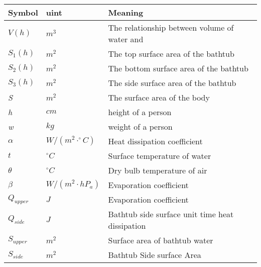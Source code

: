 \documentclass{mcmthesis}
\begin{document}
\begin{table}[H]
        \setlength{\abovecaptionskip}{0pt}
        \setlength{\belowcaptionskip}{0pt}
                 \\
        \begin{tabular}{p{1.8cm}|p{2.2cm}|p{9cm}}
        \hline
        \rowcolor[gray]{0.9}\bf{Symbol}	&\bf{uint}      &\bf{Meaning}\\
        \hline
        $V(h)$			& $m^3  $		 & The relationship between volume of water and  \\
        $S_{1}(h)$		& $m^2  $		 & The top surface area of the bathtub 	\\
        $S_{2}(h)$		& $m^2  $		 & The bottom surface area of the bathtub 	\\
        $S_{3}(h)$		& $m^2  $		 & The side surface area of the bathtub 	\\
        \emph{S}	& $m^2  $		 & The surface area of the body\\
        \emph{h}	& $cm	$        & height of a person \\
        \emph{w}	& $kg	$        & weight of a person \\
        $\alpha$		& $ W/(m^{2}\cdot ^{\circ}C)  $		 & Heat dissipation coefficient\\
        $t$		& $ ^{\circ}C  $		 & Surface temperature of water \\
        $\theta$		& $^{\circ}C$		 & Dry bulb temperature of air\\
        $\beta$		& $W/(m^{2}\cdot hP_{a})$		 & Evaporation coefficient\\
        $Q_{upper}$		& $J$		 & Evaporation coefficient\\
		$Q_{side}$		& $J$		 & Bathtub side surface unit time heat dissipation\\
		$S_{upper}$		& $m^2$		 & Surface area of bathtub water\\
		$S_{side}$		& $m^2$		 & Bathtub Side surface Area\\

        \hline
        \end{tabular}
        \end{table}

\end{document}
